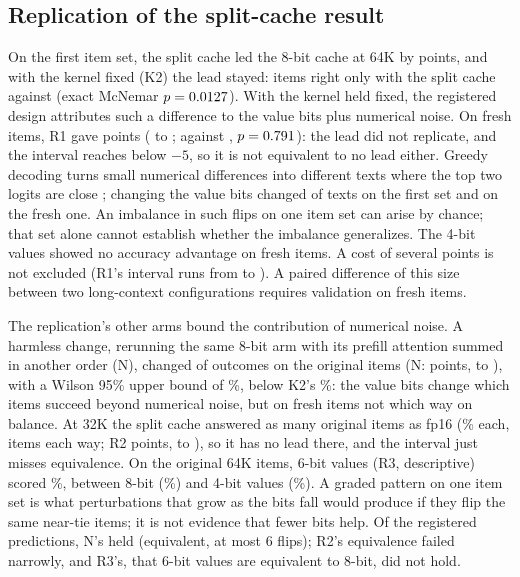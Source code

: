 \documentclass[11pt,letterpaper]{article}
\begin{document}
\subsection{Replication of the split-cache result}
\label{sec:rep}
On the first item set, the split cache led the 8-bit cache at 64K by
\PeHTwoSAbs{} points, and with the kernel fixed (K2) the lead stayed:
\PeKTwoTen{} items right only with the split cache against \PeKTwoOtt{} (exact
McNemar $p=0.0127$). With the kernel held fixed, the registered design
attributes such a difference to the value bits plus numerical noise. On
\PeROneN{} fresh items, R1 gave \PeROneDiff{} points (\PeROneLo{} to
\PeROneHi; \PeROneTen{} against \PeROneOtt, $p=0.791$): the lead did not
replicate, and the interval reaches below $-5$, so it is not equivalent to no
lead either. Greedy decoding turns small numerical differences into different
texts where the top two logits are close
\citep{yuan2025nondeterminism,du2026greedy}; changing the value bits changed
\PeKTwoDiffer{} of \PeHTwoN{} texts on the first set and \PeROneDiffer{} on the
fresh one. An imbalance in such flips on one item set can arise by chance; that set
alone cannot establish whether the imbalance generalizes. The 4-bit values showed no
accuracy advantage on fresh items. A cost of several points is not excluded (R1's interval
runs from \PeROneLo{} to \PeROneHi). A paired difference of this size between two long-context configurations
requires validation on fresh items.

The replication's other arms bound the contribution of numerical noise. A harmless change, rerunning the same 8-bit arm
with its prefill attention summed in another order (N), changed
\PeNzDisc{} of \PeNzN{} outcomes on the original items (N: \PeNzDiff{}
points, \PeNzLo{} to \PeNzHi), with a Wilson 95\% upper bound of
\PeNzWilsonHi\%, below K2's \PeNzKTwoDisc\%: the value bits change which
items succeed beyond numerical noise, but on fresh items not which way on
balance. At 32K the split cache answered as many original items as fp16
(\PeRTwoAccA\% each, \PeRTwoTen{} items each way; R2 \PeRTwoDiff{} points,
\PeRTwoLo{} to \PeRTwoHi), so it has no lead there, and the interval just
misses equivalence. On the original 64K items, 6-bit values (R3,
descriptive) scored \PeRThreeSixAcc\%, between 8-bit (\PeRThreeEightAcc\%)
and 4-bit values (\PeRThreeFourAcc\%). A graded pattern on one item set is what
perturbations that grow as the bits fall would produce if they flip the same
near-tie items; it is not evidence that fewer bits help. Of the registered
predictions, N's held (equivalent, at most 6 flips); R2's equivalence failed
narrowly, and R3's, that 6-bit values are equivalent to 8-bit, did not hold.
\end{document}
